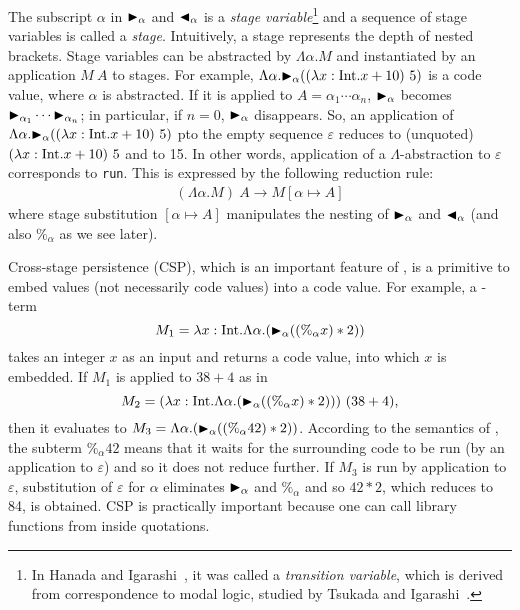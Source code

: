 The subscript $\alpha$ in ${\mathop{\blacktriangleright}}_\alpha$ and ${\mathop{\blacktriangleleft}}_\alpha$ is a \textit{stage
  variable}\footnote{%
  In Hanada and Igarashi~\cite{Hanada2014}, it was called a
  \textit{transition variable}, which is derived from correspondence
  to modal logic, studied by Tsukada and Igarashi~\cite{Tsukada}.} and
a sequence of stage variables is called a \textit{stage}.  Intuitively,
a stage represents the depth of nested brackets.  Stage variables can be
abstracted by $\Lambda\alpha.M$ and instantiated by an application
$M\ A$ to stages.  For example,
$\Lambda\alpha.{\mathop{\blacktriangleright}}_\alpha ((\lambda x:\textrm{Int}.x+10)\ 5)$ is a code value,
where \(\alpha\) is abstracted.  If it is applied to \(A = \alpha_1 \cdots \alpha_n\), \({\mathop{\blacktriangleright}}_\alpha\) becomes \({\mathop{\blacktriangleright}}_{\alpha_1} \cdots {\mathop{\blacktriangleright}}_{\alpha_n}\); in particular,
if \(n = 0\), \({\mathop{\blacktriangleright}}_\alpha\) disappears.  So, an
application of $\Lambda\alpha.{\mathop{\blacktriangleright}}_\alpha ((\lambda x:\textrm{Int}.x+10)\ 5)$
pto the empty sequence \(\varepsilon\) reduces to
(unquoted) \((\lambda x:\textrm{Int}.x+10)\ 5\) and to 15.  In other words, application of a
\(\Lambda\)-abstraction to $\varepsilon$ corresponds to \texttt{run}.
This is expressed by the following reduction rule:
\begin{align*}
	(\Lambda\alpha.M)\ A \longrightarrow M[\alpha\mapsto A]
\end{align*}
where stage substitution \([\alpha \mapsto A]\) manipulates the nesting of
\({\mathop{\blacktriangleright}}_\alpha\) and \({\mathop{\blacktriangleleft}}_\alpha\) (and also \(\%_\alpha\) as we see later).

Cross-stage persistence (CSP), which is an important feature of \LTP,
is a primitive to embed values (not necessarily code values) into a
code value.  For example, a \LTP-term
\[
  M_1 = \lambda x:\textrm{Int}.\Lambda\alpha.({\mathop{\blacktriangleright}}_\alpha ((\%_\alpha x) * 2))
\]
takes an integer \(x\) as an input and returns a code value, into
which \(x\) is embedded.  If $M_1$ is applied to $38 + 4$ as in
\[
  M_2 = (\lambda x:\textrm{Int}.\Lambda\alpha.({\mathop{\blacktriangleright}}_\alpha ((\%_\alpha x) * 2)))\ (38 + 4),
\]
then it evaluates to
\(M_3 = \Lambda\alpha.({\mathop{\blacktriangleright}}_\alpha ((\%_\alpha 42) * 2))\).  According
to the semantics of \LTP, the subterm $\%_\alpha 42$ means that it
waits for the surrounding code to be run (by an application to
$\varepsilon$) and so it does not reduce further.  If \(M_3\) is run
by application to \(\varepsilon\), substitution of \(\varepsilon\) for
\(\alpha\) eliminates \({\mathop{\blacktriangleright}}_\alpha\) and \(\%_\alpha\) and so
\(42 * 2\), which reduces to 84, is obtained.
CSP is practically important because
one can call library functions from inside quotations.  

